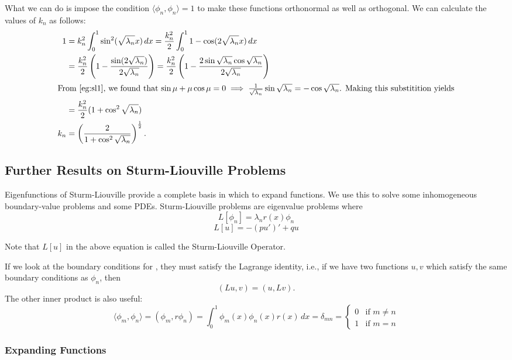 What we can do is impose the condition $\langle \phi_n, \phi_n \rangle = 1$ to make these functions orthonormal as well as orthogonal. We can calculate the values of $k_n$ as follows:
\begin{align*}
	1 &= k_n^2 \int_0^1 \sin^2(\sqrt{\lambda_n} x) \,dx = \frac{k_n^2}{2} \int_0^1 1 - \cos(2\sqrt{\lambda_n}x) \,dx \\
	&= \frac{k_n^2}{2} \left(1 - \frac{\sin(2\sqrt{\lambda_n})}{2\sqrt{\lambda_n}}\right) = \frac{k_n^2}{2} \left(1 - \frac{2\sin\sqrt{\lambda_n}\cos\sqrt{\lambda_n}}{2\sqrt{\lambda_n}}\right) \\
	\intertext{From \Cref{eg:sl1}, we found that $\sin\mu + \mu\cos\mu = 0 \implies \frac{1}{\sqrt{\lambda_n}}\sin\sqrt{\lambda_n} = -\cos\sqrt{\lambda_n}$. Making this substitition yields}
	&= \frac{k_n^2}{2} (1 + \cos^2\sqrt{\lambda_n}) \\
	k_n &= \left(\frac{2}{1 + \cos^2\sqrt{\lambda_n}}\right)^{\frac12}.
\end{align*}

\subsection{Further Results on Sturm-Liouville Problems}

Eigenfunctions of Sturm-Liouville provide a complete basis in which to expand functions. We use this to solve some inhomogeneous boundary-value problems and some PDEs.
Sturm-Liouville problems are eigenvalue problems where 
\begin{equation}\label{eq6.2.1}
	L[\phi_n] = \lambda_n r(x) \phi_n
\end{equation}
\[
L[u] = -(pu')' + qu
\]

Note that $L[u]$ in the above equation is called the Sturm-Liouville Operator.

If we look at the boundary conditions for , they must satisfy the Lagrange identity, i.e., if we have two functions $u, v$ which satisfy the same boundary conditions as $\phi_n$, then
\[
	(Lu, v) = (u, Lv).
\]
The other inner product is also useful:
\[
	\langle \phi_m, \phi_n\rangle = (\phi_m, r\phi_n) = \int_0^1 \phi_m(x) \phi_n(x) r(x) \,dx = \delta_{mn} = \begin{cases} 0 & \text{if } m \neq n \\ 1 & \text{if } m = n \end{cases}
\]

\subsubsection{Expanding Functions}\label{sec:slexpand}

